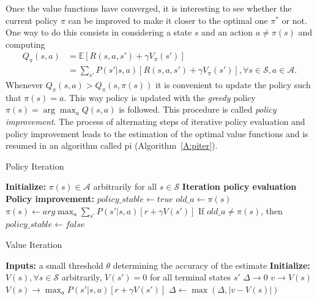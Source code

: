 Once the value functions have converged, it is interesting to see whether the current policy $\pi$ can be improved to make it closer to the optimal one $\pi^*$ or not. One way to do this consists in considering a state $s$ and an action $a \neq \pi(s)$ and computing
\begin{align}
 Q_\pi(s,a) &= \mathbb{E}[R(s,a,s') + \gamma V_\pi(s')]\nonumber\\
            &= \sum_{s'} P(s' | s,a)[R(s,a,s') + \gamma V_\pi(s')], \forall s \in \mathcal{S}, a \in \mathcal{A}.
\end{align}
Whenever $Q_\pi(s,a) > Q_\pi(s, \pi(s))$ it is convenient to update the policy such that $\pi(s) = a$. This way policy is updated with the \textit{greedy} policy $\pi(s) = \arg \max_{a} Q(s,a)$ is followed. This procedure is called \textit{policy improvement}.
The process of alternating steps of iterative policy evaluation and policy improvement leads to the estimation of the optimal value functions and is resumed in an algorithm called \gls{pi} (Algorithm~\ref{A:piter}).
\begin{algorithm}[t]
 \caption{Policy Iteration}
 \begin{algorithmic}[1]\label{A:piter}
  \STATE \textbf{Initialize:} $\pi(s) \in \mathcal{A}$ arbitrarily for all $s \in \mathcal{S}$
  \REPEAT
  \STATE \textbf{Iteration policy evaluation}
  \STATE \textbf{Policy improvement:}
  \STATE $policy\_stable \gets true$
  \STATE $old\_a \gets \pi(s)$
  \STATE $\pi(s) \gets arg\max_a \sum_{s'} P(s'|s,a)[r + \gamma V(s')]$
  \STATE If $old\_a \neq \pi(s)$, then $policy\_stable \gets false$
  \ENDFOR
 \end{algorithmic}
\end{algorithm}

\begin{algorithm}[t]
 \caption{Value Iteration}
 \begin{algorithmic}[1]\label{A:viter}
  \STATE \textbf{Inputs:} a small threshold $\theta$ determining the accuracy of the estimate
  \STATE \textbf{Initialize:} $V(s), \forall s \in \mathcal{S}$ arbitrarily, $V(s') = 0$ for all terminal states $s'$
  \REPEAT
  \STATE $\Delta \to 0$
  \STATE $v \to V(s)$
  \STATE $V(s) \to \max_{a} P(s'|s,a)[r + \gamma V(s')]$
  \STATE $\Delta \gets \max(\Delta, |v - V(s)|)$
  \ENDFOR
  \UNTIL{$\Delta < \theta$}
 \end{algorithmic}
\end{algorithm}

